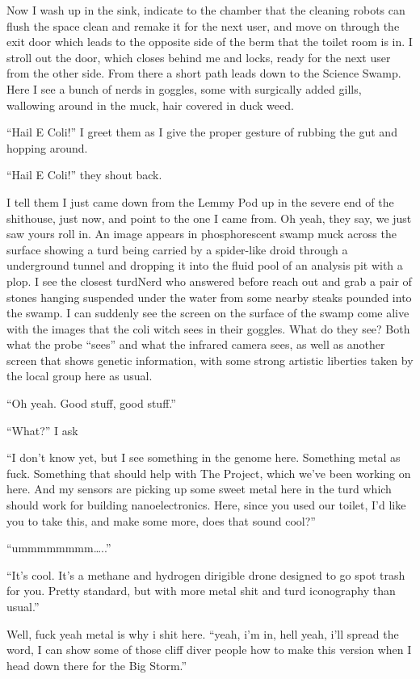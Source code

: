 Now I wash up in the sink, indicate to the chamber that the cleaning
robots can flush the space clean and remake it for the next user, and
move on through the exit door which leads to the opposite side of the
berm that the toilet room is in. I stroll out the door, which closes
behind me and locks, ready for the next user from the other side. From
there a short path leads down to the Science Swamp. Here I see a bunch
of nerds in goggles, some with surgically added gills, wallowing around
in the muck, hair covered in duck weed.

``Hail E Coli!'' I greet them as I give the proper gesture of rubbing
the gut and hopping around.

``Hail E Coli!'' they shout back.

I tell them I just came down from the Lemmy Pod up in the severe end of
the shithouse, just now, and point to the one I came from. Oh yeah, they
say, we just saw yours roll in. An image appears in phosphorescent swamp
muck across the surface showing a turd being carried by a spider-like
droid through a underground tunnel and dropping it into the fluid pool
of an analysis pit with a plop. I see the closest turdNerd who answered
before reach out and grab a pair of stones hanging suspended under the
water from some nearby steaks pounded into the swamp. I can suddenly see
the screen on the surface of the swamp come alive with the images that
the coli witch sees in their goggles. What do they see? Both what the
probe ``sees'' and what the infrared camera sees, as well as another
screen that shows genetic information, with some strong artistic
liberties taken by the local group here as usual.

``Oh yeah. Good stuff, good stuff.''

``What?'' I ask

``I don't know yet, but I see something in the genome here. Something
metal as fuck. Something that should help with The Project, which we've
been working on here. And my sensors are picking up some sweet metal
here in the turd which should work for building nanoelectronics. Here,
since you used our toilet, I'd like you to take this, and make some
more, does that sound cool?''

``ummmmmmmm\ldots{}..''

``It's cool. It's a methane and hydrogen dirigible drone designed to go
spot trash for you. Pretty standard, but with more metal shit and turd
iconography than usual.''

Well, fuck yeah metal is why i shit here. ``yeah, i'm in, hell yeah,
i'll spread the word, I can show some of those cliff diver people how to
make this version when I head down there for the Big Storm.''

